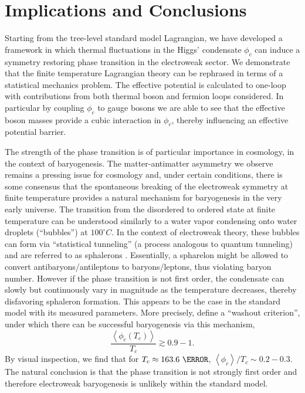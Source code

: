 \documentclass[%
 reprint,
nofootinbib,
 amsmath,amssymb,
 aps,
floatfix,
]{revtex4-1}
\begin{document}
\section{\label{sec:baryogenesis}Implications and Conclusions}
Starting from the tree-level standard model Lagrangian, we have developed a framework in which thermal fluctuations in the Higgs' condensate $\phi_c$ can induce a symmetry restoring phase transition in the electroweak sector.
We demonstrate that the finite temperature Lagrangian theory can be rephrased in terms of a statistical mechanics problem.
The effective potential is calculated to one-loop with contributions from both thermal boson and fermion loops considered.
In particular by coupling $\phi_c$ to gauge bosons we are able to see that the effective boson masses provide a cubic interaction in $\phi_c$, thereby influencing an effective potential barrier.

The strength of the phase transition is of particular importance in cosmology, in the context of baryogenesis.
The matter-antimatter asymmetry we observe remains a pressing issue for cosmology and, under certain conditions, there is some consensus that the spontaneous breaking of the electroweak symmetry at finite temperature provides a natural mechanism for baryogenesis in the very early universe.
The transition from the disordered to ordered state at finite temperature can be understood similarly to a water vapor condensing onto water droplets (``bubbles'') at $100^{\circ}C$.
In the context of electroweak theory, these bubbles can form via ``statistical tunneling'' (a process analogous to quantum tunneling) and are referred to as sphalerons \cite{ah92,long12,quiros99}.
Essentially, a spharelon might be allowed to convert antibaryons/antileptons to baryons/leptons, thus violating baryon number.
However if the phase transition is not first order, the condensate can slowly but continuously vary in magnitude as the temperature decreases, thereby disfavoring sphaleron formation.
This appears to be the case in the standard model with its measured parameters.
More precisely, \cite{long12,kp14} define a ``washout criterion'', under which there can be successful baryogenesis via this mechanism,
\begin{equation}
    \frac{\left<\phi_c(T_c)\right>}{T_c} \gtrsim 0.9-1.
\end{equation}
By visual inspection, we find that for $T_c \approx 163.6~\GeV$, $\left<\phi_c\right> / T_c \sim 0.2-0.3$.
The natural conclusion is that the phase transition is not strongly first order and therefore electroweak baryogenesis is unlikely within the standard model.
\end{document}
